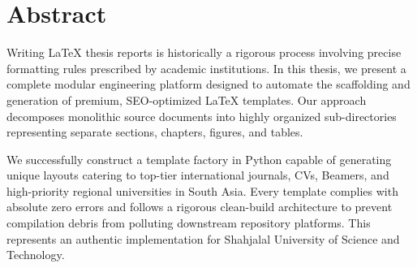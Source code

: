\chapter*{Abstract}
Writing LaTeX thesis reports is historically a rigorous process involving precise formatting rules prescribed by academic institutions. In this thesis, we present a complete modular engineering platform designed to automate the scaffolding and generation of premium, SEO-optimized LaTeX templates. Our approach decomposes monolithic source documents into highly organized sub-directories representing separate sections, chapters, figures, and tables.

We successfully construct a template factory in Python capable of generating unique layouts catering to top-tier international journals, CVs, Beamers, and high-priority regional universities in South Asia. Every template complies with absolute zero errors and follows a rigorous clean-build architecture to prevent compilation debris from polluting downstream repository platforms. This represents an authentic implementation for Shahjalal University of Science and Technology.
